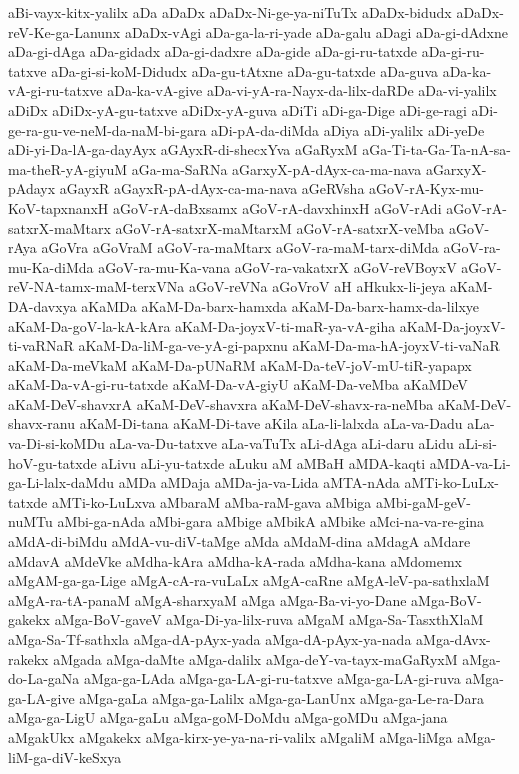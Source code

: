 {aBi-vayx-kitx-yalilx
aDa
aDaDx
aDaDx-Ni-ge-ya-niTuTx
aDaDx-bidudx
aDaDx-reV-Ke-ga-Lanunx
aDaDx-vAgi
aDa-ga-la-ri-yade
aDa-galu
aDagi
aDa-gi-dAdxne
aDa-gi-dAga
aDa-gidadx
aDa-gi-dadxre
aDa-gide
aDa-gi-ru-tatxde
aDa-gi-ru-tatxve
aDa-gi-si-koM-Didudx
aDa-gu-tAtxne
aDa-gu-tatxde
aDa-guva
aDa-ka-vA-gi-ru-tatxve
aDa-ka-vA-give
aDa-vi-yA-ra-Nayx-da-lilx-daRDe
aDa-vi-yalilx
aDiDx
aDiDx-yA-gu-tatxve
aDiDx-yA-guva
aDiTi
aDi-ga-Dige
aDi-ge-ragi
aDi-ge-ra-gu-ve-neM-da-naM-bi-gara
aDi-pA-da-diMda
aDiya
aDi-yalilx
aDi-yeDe
aDi-yi-Da-lA-ga-dayAyx
aGAyxR-di-shecxYva
aGaRyxM
aGa-Ti-ta-Ga-Ta-nA-sa-ma-theR-yA-giyuM
aGa-ma-SaRNa
aGarxyX-pA-dAyx-ca-ma-nava
aGarxyX-pAdayx
aGayxR
aGayxR-pA-dAyx-ca-ma-nava
aGeRVsha
aGoV-rA-Kyx-mu-KoV-tapxnanxH
aGoV-rA-daBxsamx
aGoV-rA-davxhinxH
aGoV-rAdi
aGoV-rA-satxrX-maMtarx
aGoV-rA-satxrX-maMtarxM
aGoV-rA-satxrX-veMba
aGoV-rAya
aGoVra
aGoVraM
aGoV-ra-maMtarx
aGoV-ra-maM-tarx-diMda
aGoV-ra-mu-Ka-diMda
aGoV-ra-mu-Ka-vana
aGoV-ra-vakatxrX
aGoV-reVBoyxV
aGoV-reV-NA-tamx-maM-terxVNa
aGoV-reVNa
aGoVroV
aH
aHkukx-li-jeya
aKaM-DA-davxya
aKaMDa
aKaM-Da-barx-hamxda
aKaM-Da-barx-hamx-da-lilxye
aKaM-Da-goV-la-kA-kAra
aKaM-Da-joyxV-ti-maR-ya-vA-giha
aKaM-Da-joyxV-ti-vaRNaR
aKaM-Da-liM-ga-ve-yA-gi-papxnu
aKaM-Da-ma-hA-joyxV-ti-vaNaR
aKaM-Da-meVkaM
aKaM-Da-pUNaRM
aKaM-Da-teV-joV-mU-tiR-yapapx
aKaM-Da-vA-gi-ru-tatxde
aKaM-Da-vA-giyU
aKaM-Da-veMba
aKaMDeV
aKaM-DeV-shavxrA
aKaM-DeV-shavxra
aKaM-DeV-shavx-ra-neMba
aKaM-DeV-shavx-ranu
aKaM-Di-tana
aKaM-Di-tave
aKila
aLa-li-lalxda
aLa-va-Dadu
aLa-va-Di-si-koMDu
aLa-va-Du-tatxve
aLa-vaTuTx
aLi-dAga
aLi-daru
aLidu
aLi-si-hoV-gu-tatxde
aLivu
aLi-yu-tatxde
aLuku
aM
aMBaH
aMDA-kaqti
aMDA-va-Li-ga-Li-lalx-daMdu
aMDa
aMDaja
aMDa-ja-va-Lida
aMTA-nAda
aMTi-ko-LuLx-tatxde
aMTi-ko-LuLxva
aMbaraM
aMba-raM-gava
aMbiga
aMbi-gaM-geV-nuMTu
aMbi-ga-nAda
aMbi-gara
aMbige
aMbikA
aMbike
aMci-na-va-re-gina
aMdA-di-biMdu
aMdA-vu-diV-taMge
aMda
aMdaM-dina
aMdagA
aMdare
aMdavA
aMdeVke
aMdha-kAra
aMdha-kA-rada
aMdha-kana
aMdomemx
aMgAM-ga-ga-Lige
aMgA-cA-ra-vuLaLx
aMgA-caRne
aMgA-leV-pa-sathxlaM
aMgA-ra-tA-panaM
aMgA-sharxyaM
aMga
aMga-Ba-vi-yo-Dane
aMga-BoV-gakekx
aMga-BoV-gaveV
aMga-Di-ya-lilx-ruva
aMgaM
aMga-Sa-TasxthXlaM
aMga-Sa-Tf-sathxla
aMga-dA-pAyx-yada
aMga-dA-pAyx-ya-nada
aMga-dAvx-rakekx
aMgada
aMga-daMte
aMga-dalilx
aMga-deY-va-tayx-maGaRyxM
aMga-do-La-gaNa
aMga-ga-LAda
aMga-ga-LA-gi-ru-tatxve
aMga-ga-LA-gi-ruva
aMga-ga-LA-give
aMga-gaLa
aMga-ga-Lalilx
aMga-ga-LanUnx
aMga-ga-Le-ra-Dara
aMga-ga-LigU
aMga-gaLu
aMga-goM-DoMdu
aMga-goMDu
aMga-jana
aMgakUkx
aMgakekx
aMga-kirx-ye-ya-na-ri-valilx
aMgaliM
aMga-liMga
aMga-liM-ga-diV-keSxya
}
